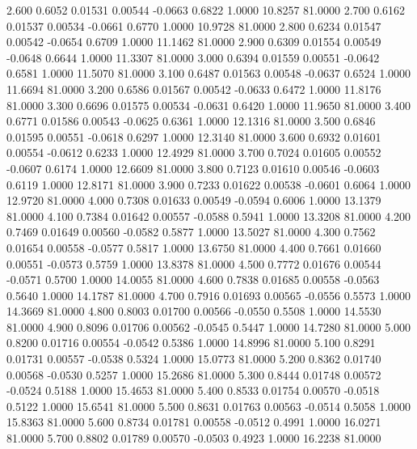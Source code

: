    2.600   0.6052   0.01531   0.00544  -0.0663   0.6822   1.0000  10.8257  81.0000
   2.700   0.6162   0.01537   0.00534  -0.0661   0.6770   1.0000  10.9728  81.0000
   2.800   0.6234   0.01547   0.00542  -0.0654   0.6709   1.0000  11.1462  81.0000
   2.900   0.6309   0.01554   0.00549  -0.0648   0.6644   1.0000  11.3307  81.0000
   3.000   0.6394   0.01559   0.00551  -0.0642   0.6581   1.0000  11.5070  81.0000
   3.100   0.6487   0.01563   0.00548  -0.0637   0.6524   1.0000  11.6694  81.0000
   3.200   0.6586   0.01567   0.00542  -0.0633   0.6472   1.0000  11.8176  81.0000
   3.300   0.6696   0.01575   0.00534  -0.0631   0.6420   1.0000  11.9650  81.0000
   3.400   0.6771   0.01586   0.00543  -0.0625   0.6361   1.0000  12.1316  81.0000
   3.500   0.6846   0.01595   0.00551  -0.0618   0.6297   1.0000  12.3140  81.0000
   3.600   0.6932   0.01601   0.00554  -0.0612   0.6233   1.0000  12.4929  81.0000
   3.700   0.7024   0.01605   0.00552  -0.0607   0.6174   1.0000  12.6609  81.0000
   3.800   0.7123   0.01610   0.00546  -0.0603   0.6119   1.0000  12.8171  81.0000
   3.900   0.7233   0.01622   0.00538  -0.0601   0.6064   1.0000  12.9720  81.0000
   4.000   0.7308   0.01633   0.00549  -0.0594   0.6006   1.0000  13.1379  81.0000
   4.100   0.7384   0.01642   0.00557  -0.0588   0.5941   1.0000  13.3208  81.0000
   4.200   0.7469   0.01649   0.00560  -0.0582   0.5877   1.0000  13.5027  81.0000
   4.300   0.7562   0.01654   0.00558  -0.0577   0.5817   1.0000  13.6750  81.0000
   4.400   0.7661   0.01660   0.00551  -0.0573   0.5759   1.0000  13.8378  81.0000
   4.500   0.7772   0.01676   0.00544  -0.0571   0.5700   1.0000  14.0055  81.0000
   4.600   0.7838   0.01685   0.00558  -0.0563   0.5640   1.0000  14.1787  81.0000
   4.700   0.7916   0.01693   0.00565  -0.0556   0.5573   1.0000  14.3669  81.0000
   4.800   0.8003   0.01700   0.00566  -0.0550   0.5508   1.0000  14.5530  81.0000
   4.900   0.8096   0.01706   0.00562  -0.0545   0.5447   1.0000  14.7280  81.0000
   5.000   0.8200   0.01716   0.00554  -0.0542   0.5386   1.0000  14.8996  81.0000
   5.100   0.8291   0.01731   0.00557  -0.0538   0.5324   1.0000  15.0773  81.0000
   5.200   0.8362   0.01740   0.00568  -0.0530   0.5257   1.0000  15.2686  81.0000
   5.300   0.8444   0.01748   0.00572  -0.0524   0.5188   1.0000  15.4653  81.0000
   5.400   0.8533   0.01754   0.00570  -0.0518   0.5122   1.0000  15.6541  81.0000
   5.500   0.8631   0.01763   0.00563  -0.0514   0.5058   1.0000  15.8363  81.0000
   5.600   0.8734   0.01781   0.00558  -0.0512   0.4991   1.0000  16.0271  81.0000
   5.700   0.8802   0.01789   0.00570  -0.0503   0.4923   1.0000  16.2238  81.0000
